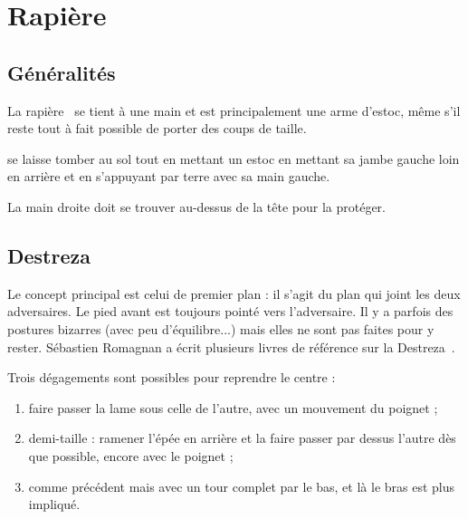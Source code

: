 \chapter{Rapière}


\section{Généralités}


La rapière~\footnotemark{} se tient à une main et est principalement une arme d'estoc, même s'il reste tout à fait possible de porter des coups de taille.


\begin{technique}

\A se laisse tomber au sol tout en mettant un estoc en mettant sa jambe gauche loin en arrière et en s'appuyant par terre avec sa main gauche.

La main droite doit se trouver au-dessus de la tête pour la protéger.

\end{technique}


\section{Destreza}


Le concept principal est celui de premier plan : il s'agit du plan qui joint les deux adversaires.
Le pied avant est toujours pointé vers l'adversaire.
Il y a parfois des postures bizarres (avec peu d'équilibre...) mais elles ne sont pas faites pour y rester.
Sébastien Romagnan a écrit plusieurs livres de référence sur la Destreza~\cite{Romagnan:2013:DestrezaManuel, Romagnan:2016:DestrezaTailleRevers}.

Trois dégagements sont possibles pour reprendre le centre :
\begin{enumerate}
	\it
	\item faire passer la lame sous celle de l'autre, avec un mouvement du poignet ;
	\item demi-taille : ramener l'épée en arrière et la faire passer par dessus l'autre dès que possible, encore avec le poignet ;
	\item comme précédent mais avec un tour complet par le bas, et là le bras est plus impliqué.
\end{enumerate}


